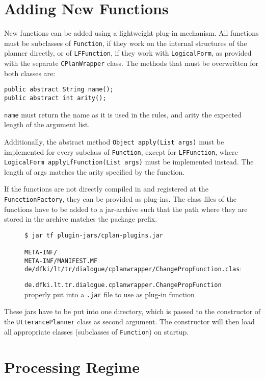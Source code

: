 \documentclass[11pt,a4paper]{article}
\begin{document}
\section{Adding New Functions}

New functions can be added using a lightweight plug-in mechanism. All functions
must be subclasses of \texttt{Function}, if they work on the internal
structures of the planner directly, or of \texttt{LFFunction}, if they work
with \texttt{LogicalForm}, as provided with the separate \texttt{CPlanWrapper}
class. The methods that must be overwritten for both classes are:

\begin{verbatim}
public abstract String name();
public abstract int arity();
\end{verbatim}

\texttt{name} must return the name as it is used in the rules, and arity the
expected length of the argument list.

Additionally, the abstract method \verb|Object apply(List args)| must be
implemented for every subclass of \texttt{Function}, except for
\texttt{LFFunction}, where \verb|LogicalForm applyLfFunction(List args)|
must be implemented instead. The length of args matches the arity specified by
the function.

If the functions are not directly compiled in and registered at the
\texttt{FuncctionFactory}, they can be provided as plug-ins. The class files
of the functions have to be added to a jar-archive such that the path where
they are stored in the archive matches the package prefix.

\begin{figure}[htbp]
\begin{verbatim}
$ jar tf plugin-jars/cplan-plugins.jar

META-INF/
META-INF/MANIFEST.MF
de/dfki/lt/tr/dialogue/cplanwrapper/ChangePropFunction.class
\end{verbatim}
\caption{\texttt{de.dfki.lt.tr.dialogue.cplanwrapper.ChangePropFunction}
  properly put into a \texttt{.jar} file to use as plug-in function }
\end{figure}

These jars have to be put into one directory, which is passed to the
constructor of the \texttt{UtterancePlanner} class as second argument. The
constructor will then load all appropriate classes (subclasses of
\texttt{Function}) on startup.


\section{Processing Regime\label{sec:procregime}}
\end{document}
